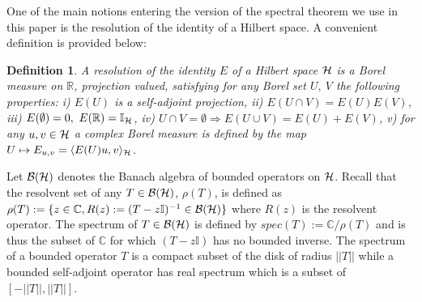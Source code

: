 \documentclass[a4paper]{jpconf}
\numberwithin{equation}{section}
\newcommand\bbone{{ \mathbb{I}}}
\newtheorem{adefinition}{Definition}
\theoremstyle{nonumberplain}
\begin{document}
One of the main notions entering the version of the spectral theorem we use in this paper is the resolution of the identity of a Hilbert space. A convenient definition is provided below:
\begin{adefinition}\label{resolution}
A resolution of the identity $E$ of a Hilbert space ${\cal{H}}$ is a Borel measure on $\mathbb{R}$, projection valued, satisfying for any Borel set $U,\ V$ the following properties: i) $E(U)$ is a self-adjoint projection, ii) $E(U\cap V)=E(U)E(V)$, iii) $E(\emptyset)=0,\ E(\mathbb{R})=\bbone_{{\cal{H}}}$, iv) $U\cap V=\emptyset\Rightarrow E(U\cup V)=E(U)+E(V)$, v) for any $u,v\in\cal{H}$ a complex Borel measure is defined by the map $U\mapsto E_{u,v}=\langle E(U)u,v \rangle_{\cal{H}}$.
\end{adefinition}
Let ${\cal{B}}({\cal{H}})$ denotes the Banach algebra of bounded operators on ${\cal{H}}$. Recall that the resolvent set of any $T\in{\cal{B}}({\cal{H}})$, $\rho(T)$, is defined as $\rho(T):=\{z\in\mathbb{C}, R(z):=(T-z\bbone)^{-1}\in{\cal{B}}({\cal{H}})  \}$ where $R(z)$ is the resolvent operator. The spectrum of $T\in{\cal{B}}({\cal{H}})$ is defined by $spec(T):=\mathbb{C}/\rho(T)$ and is thus the subset of $\mathbb{C}$ for which $(T-z\bbone)$ has no bounded inverse. The spectrum of a bounded operator $T$ is a compact subset of the disk of radius $||T||$ while a bounded self-adjoint operator has real spectrum which is a subset of 
$[-||T||,||T||]$.\par
\end{document}
